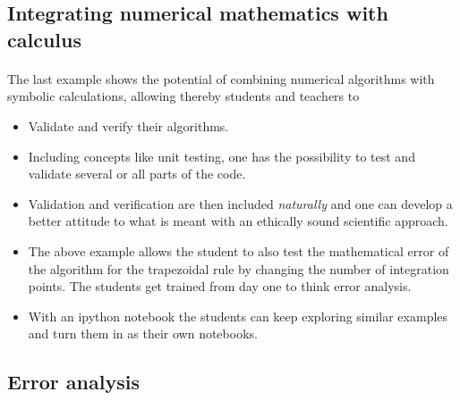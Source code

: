 \documentclass[%
twoside,                 %
final,                   %
10pt]{article}
\begin{document}
\subsection*{Integrating numerical mathematics with calculus}

\paragraph{}
The last example shows the potential of combining numerical algorithms with symbolic calculations, allowing thereby students and teachers to

\begin{itemize}
\item Validate and verify  their  algorithms. 

\item Including concepts like unit testing, one has the possibility to test and validate several or all parts of the code.

\item Validation and verification are then included \emph{naturally} and one can develop a better attitude to what is meant with an ethically sound scientific approach.

\item The above example allows the student to also test the mathematical error of the algorithm for the trapezoidal rule by changing the number of integration points. The students get trained from day one to think error analysis. 

\item With an ipython notebook the students can keep exploring similar examples and turn them in as their own notebooks. 
\end{itemize}

\noindent



\subsection*{Error analysis}

\end{document}
